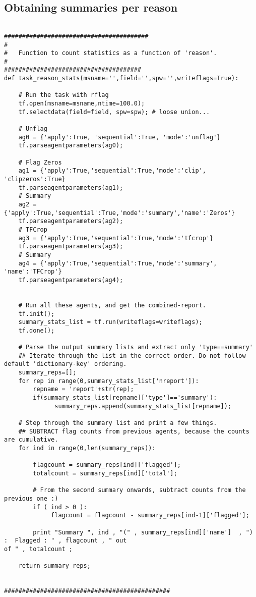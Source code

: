 \subsection{Obtaining summaries per reason}

\begin{verbatim}

########################################
#
#   Function to count statistics as a function of 'reason'.
#
######################################
def task_reason_stats(msname='',field='',spw='',writeflags=True):

    # Run the task with rflag
    tf.open(msname=msname,ntime=100.0);
    tf.selectdata(field=field, spw=spw); # loose union...

    # Unflag
    ag0 = {'apply':True, 'sequential':True, 'mode':'unflag'}
    tf.parseagentparameters(ag0);

    # Flag Zeros
    ag1 = {'apply':True,'sequential':True,'mode':'clip', 'clipzeros':True}
    tf.parseagentparameters(ag1);
    # Summary
    ag2 = {'apply':True,'sequential':True,'mode':'summary','name':'Zeros'}
    tf.parseagentparameters(ag2);
    # TFCrop
    ag3 = {'apply':True,'sequential':True,'mode':'tfcrop'}
    tf.parseagentparameters(ag3);
    # Summary
    ag4 = {'apply':True,'sequential':True,'mode':'summary', 'name':'TFCrop'}
    tf.parseagentparameters(ag4);


    # Run all these agents, and get the combined-report.
    tf.init();
    summary_stats_list = tf.run(writeflags=writeflags);
    tf.done();

    # Parse the output summary lists and extract only 'type==summary'
    ## Iterate through the list in the correct order. Do not follow default 'dictionary-key' ordering.
    summary_reps=[];
    for rep in range(0,summary_stats_list['nreport']):
        repname = 'report'+str(rep);
        if(summary_stats_list[repname]['type']=='summary'):
              summary_reps.append(summary_stats_list[repname]);

    # Step through the summary list and print a few things.
    ## SUBTRACT flag counts from previous agents, because the counts are cumulative.
    for ind in range(0,len(summary_reps)):

        flagcount = summary_reps[ind]['flagged'];
        totalcount = summary_reps[ind]['total'];
     
        # From the second summary onwards, subtract counts from the previous one :)
        if ( ind > 0 ):
             flagcount = flagcount - summary_reps[ind-1]['flagged'];

        print "Summary ", ind , "(" , summary_reps[ind]['name']  , ") :  Flagged : " , flagcount , " out 
of " , totalcount ;

    return summary_reps; 


##############################################

\end{verbatim}


